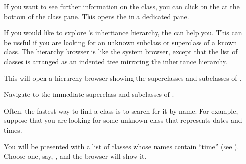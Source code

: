 \documentclass[a4paper,10pt,twoside]{book}
\begin{document}
If you want to see further information on the class, you can click on the  at the bottom of the class pane. This opens the  in a dedicated pane.

If you would like to explore \sq's inheritance hierarchy, the  can help you.  
This can be useful if you are looking for an unknown subclass or superclass of a known class.
The hierarchy browser is like the system browser, except that the list of classes is arranged as an indented tree mirroring the inheritance hierarchy.

\noindent
This will open a hierarchy browser showing the superclasses and subclasses of .


Navigate to the immediate superclass and subclasses of .

Often, the fastest way to find a class is to search for it by name.  For example, suppose that you are looking for some unknown class that represents dates and times.

\noindent
You will be presented with a list of classes whose names contain ``time'' (see ).  Choose one, say, , and the browser will show it.

\end{document}

